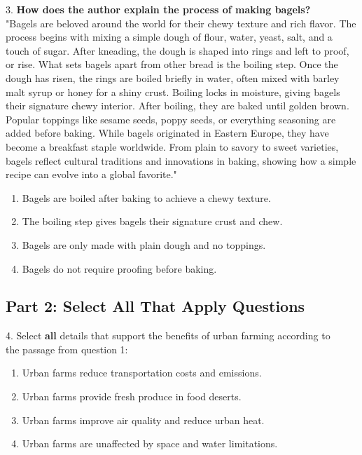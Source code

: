 \documentclass[12pt]{article}
\begin{document}
3. \textbf{How does the author explain the process of making bagels?\\}
"Bagels are beloved around the world for their chewy texture and rich flavor. The process begins with mixing a simple dough of flour, water, yeast, salt, and a touch of sugar. After kneading, the dough is shaped into rings and left to proof, or rise. What sets bagels apart from other bread is the boiling step. Once the dough has risen, the rings are boiled briefly in water, often mixed with barley malt syrup or honey for a shiny crust. Boiling locks in moisture, giving bagels their signature chewy interior. After boiling, they are baked until golden brown. Popular toppings like sesame seeds, poppy seeds, or everything seasoning are added before baking. While bagels originated in Eastern Europe, they have become a breakfast staple worldwide. From plain to savory to sweet varieties, bagels reflect cultural traditions and innovations in baking, showing how a simple recipe can evolve into a global favorite."  
\begin{enumerate}[label=\Alph*.]
    \item Bagels are boiled after baking to achieve a chewy texture.  
    \item The boiling step gives bagels their signature crust and chew.  
    \item Bagels are only made with plain dough and no toppings.  
    \item Bagels do not require proofing before baking.  
\end{enumerate}

\vspace{1cm}

\subsection*{Part 2: Select All That Apply Questions}

4. Select \textbf{all} details that support the benefits of urban farming according to \\the passage from question 1:  
\begin{enumerate}[label=\Alph*.]
    \item Urban farms reduce transportation costs and emissions.  
    \item Urban farms provide fresh produce in food deserts.  
    \item Urban farms improve air quality and reduce urban heat.  
    \item Urban farms are unaffected by space and water limitations.  
\end{enumerate}
\end{document}
